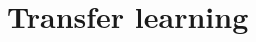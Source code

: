 \documentclass[../main.tex]{subfiles}
\begin{document}



\section{}
\section{Transfer learning}
\end{document}
